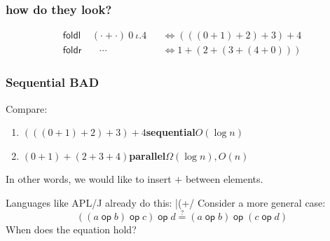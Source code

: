 \documentclass{beamer}
\DeclareMathOperator{\op}{\mathsf{op}}
\begin{document}
\begin{frame}
    \frametitle{how do they look?}
    \begin{align*}
        \mathsf{foldl} & \ (\cdot + \cdot)\ 0\ \iota.4 &  & \iff (((0 + 1) + 2) + 3) + 4 \\
        \mathsf{foldr} & \quad \cdots                  &  & \iff 1 + (2 + (3 + (4 + 0)))
    \end{align*}
    \begin{figure}[h]
        \hspace{3cm}
    \end{figure}
\end{frame}
\begin{frame}[fragile]
    \frametitle{Sequential BAD}
    Compare:
    \begin{enumerate}
        \item $(((0 + 1) + 2) + 3) + 4$\hspace{1cm}\textbf{sequential}\hfill $O(\log n)$
        \item $(0 + 1) + (2 + 3 + 4)$\hphantom{()}\hspace{1cm}\textbf{parallel}\hfill $\Omega(\log n), O(n)$
    \end{enumerate}
    In other words, we would like to insert $+$ between elements.

    Languages like APL/J already do this:
    |(+/ %
    Consider a more general case:
    \begin{equation*}
        ((a \op b) \op c) \op d \overset{?}{=} (a \op b) \op (c \op d)
    \end{equation*}
    When does the equation hold?
\end{frame}
\end{document}
